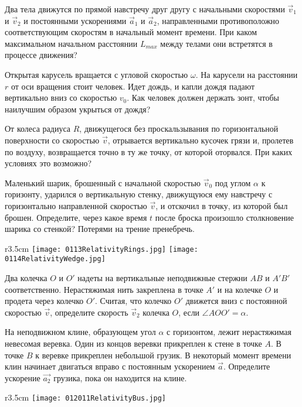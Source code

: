\AddProb Два тела движутся по прямой навстречу друг другу с начальными скоростями $\vec{v}_1$ и $\vec{v}_2$ и 
постоянными ускорениями $\vec{a}_1$ и $\vec{a}_2$, направленными противоположно соответствующим скоростям в начальный момент времени. 
При каком максимальном начальном расстоянии $L_{max}$ между телами они встретятся в процессе движения?

\AddProb Открытая карусель вращается с угловой скоростью $\omega $. На карусели на расстоянии $r$ от оси вращения стоит человек. 
Идет дождь, и капли дождя падают вертикально вниз со скоростью $v_0$. 
Как человек должен держать зонт, чтобы наилучшим образом укрыться от дождя?

\AddProb От колеса радиуса $R$, движущегося без проскальзывания по горизонтальной поверхности со скоростью $\vec v$, 
отрывается вертикально кусочек грязи и, пролетев по воздуху, возвращается точно в ту же точку, от которой оторвался. 
При каких условиях это возможно?

\AddProb Маленький шарик, брошенный с начальной скоростью $\vec{v}_0$ под углом $\alpha$ к горизонту, 
ударился о вертикальную стенку, движущуюся ему навстречу с горизонтально направленной скоростью $\vec v$, и отскочил в точку, из которой был брошен. 
Определите, через какое время $t$ после броска произошло столкновение шарика со стенкой? Потерями на трение пренебречь.

\begin{wrapfigure}{r}{3.5cm}
\texttt{[image: 0113RelativityRings.jpg]}
\texttt{[image: 0114RelativityWedge.jpg]}
\end{wrapfigure}

\AddProb Два колечка $O$ и $O'$ надеты на вертикальные неподвижные стержни $AB$ и $A'B'$ соответственно. 
Нерастяжимая нить закреплена в точке $A'$ и на колечке $O$ и продета через  колечко $O'$. 
Считая, что колечко $O'$ движется вниз с постоянной скоростью $\vec v$, определите скорость $\vec{v}_2$ колечка $O$, если  $\angle AOO' = \alpha$.

\AddProb На неподвижном клине, образующем угол $\alpha$  с горизонтом, лежит нерастяжимая невесомая веревка. 
Один из концов веревки прикреплен к стене в точке $A$. В точке $B$ к веревке прикреплен небольшой грузик. 
В некоторый момент времени клин начинает двигаться вправо с постоянным ускорением $\vec a$. 
Определите ускорение $\vec{a_{2}}$ грузика, пока он находится на клине.

\begin{wrapfigure}{r}{3.5cm}
\texttt{[image: 012011RelativityBus.jpg]}
\end{wrapfigure}

